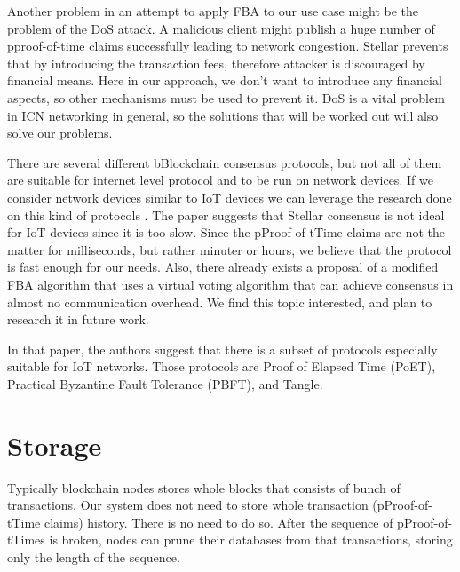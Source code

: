 Another problem in an attempt to apply FBA to our use case might be the problem of the DoS attack. A malicious client might publish a huge number of pproof-of-time claims successfully leading to network congestion. Stellar prevents that by introducing the transaction fees, therefore attacker is discouraged by financial means. Here in our approach, we don't want to introduce any financial aspects, so other mechanisms must be used to prevent it. DoS is a vital problem in ICN networking in general\cite{gasti2013and}, so the solutions that will be worked out will also solve our problems. 

There are several different bBlockchain consensus protocols, but not all of them are suitable for internet level protocol and to be run on network devices.
If we consider network devices similar to IoT devices we can leverage the research done on this kind of protocols \cite{salimitari2018survey}. The paper suggests that Stellar consensus is not ideal for IoT devices since it is too slow.
Since the pProof-of-tTime claims are not the matter for milliseconds, but rather minuter or hours, we believe that the protocol is fast enough for our needs.
Also, there already exists a proposal of a modified FBA algorithm\cite{FCPpdf50:online} that uses a virtual voting algorithm that can achieve consensus in almost no communication overhead. We find this topic interested, and plan to research it in future work.

In that paper, the authors suggest that there is a subset of protocols especially suitable for IoT networks. Those protocols are Proof of Elapsed Time (PoET), Practical Byzantine Fault Tolerance (PBFT), and Tangle.





\section{Storage}
Typically blockchain nodes stores whole blocks that consists of bunch of transactions. Our system does not need to store whole transaction (pProof-of-tTime claims) history. There is no need to do so. After the sequence of pProof-of-tTimes is broken, nodes can prune their databases from that transactions, storing only the length of the sequence.
